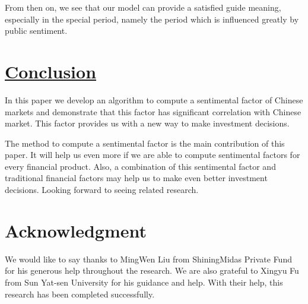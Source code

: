 \documentclass[10pt, conference, compsocconf]{IEEEtran}
\begin{document}
From then on, we see that our model can provide a satisfied guide meaning, especially in the special period, namely the period which is influenced greatly by public sentiment.

\section{\underline{Conclusion}}

In this paper we develop an algorithm to compute a sentimental factor of Chinese markets and demonstrate that this factor has significant correlation with Chinese market. This factor provides us with a new way to make investment decisions.

The method to compute a sentimental factor is the main contribution of this paper. It will help us even more if we are able to compute sentimental factors for every financial product. Also, a combination of this sentimental factor and traditional financial factors may help us to make even better investment decisions. Looking forward to seeing related research.

\section*{Acknowledgment}

We would like to say thanks to MingWen Liu from ShiningMidas Private Fund for his generous help throughout the research. We are also grateful to Xingyu Fu from Sun Yat-sen University for his guidance and help. With their help, this research has been completed successfully.
\end{document}
